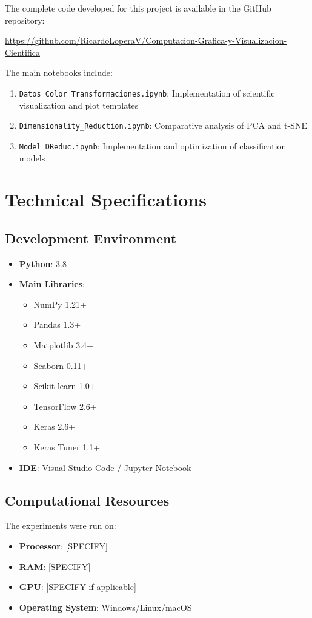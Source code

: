 \documentclass[12pt,a4paper]{article}
\begin{document}
The complete code developed for this project is available in the GitHub repository:

\begin{center}
\url{https://github.com/RicardoLoperaV/Computacion-Grafica-y-Visualizacion-Cientifica}
\end{center}

The main notebooks include:

\begin{enumerate}
    \item \texttt{Datos\_Color\_Transformaciones.ipynb}: Implementation of scientific visualization and plot templates
    \item \texttt{Dimensionality\_Reduction.ipynb}: Comparative analysis of PCA and t-SNE
    \item \texttt{Model\_DReduc.ipynb}: Implementation and optimization of classification models
\end{enumerate}

\section{Technical Specifications}

\subsection{Development Environment}

\begin{itemize}
    \item \textbf{Python}: 3.8+
    \item \textbf{Main Libraries}:
    \begin{itemize}
        \item NumPy 1.21+
        \item Pandas 1.3+
        \item Matplotlib 3.4+
        \item Seaborn 0.11+
        \item Scikit-learn 1.0+
        \item TensorFlow 2.6+
        \item Keras 2.6+
        \item Keras Tuner 1.1+
    \end{itemize}
    \item \textbf{IDE}: Visual Studio Code / Jupyter Notebook
\end{itemize}

\subsection{Computational Resources}

The experiments were run on:
\begin{itemize}
    \item \textbf{Processor}: [SPECIFY]
    \item \textbf{RAM}: [SPECIFY]
    \item \textbf{GPU}: [SPECIFY if applicable]
    \item \textbf{Operating System}: Windows/Linux/macOS
\end{itemize}
\end{document}
